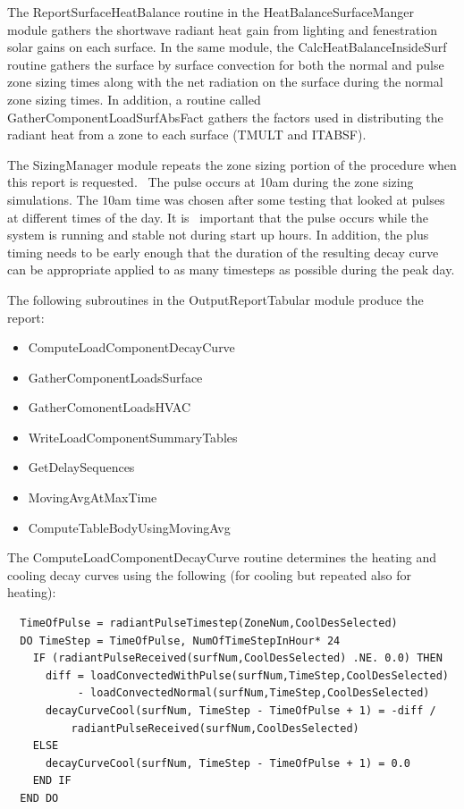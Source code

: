 The ReportSurfaceHeatBalance routine in the HeatBalanceSurfaceManger module gathers the shortwave radiant heat gain from lighting and fenestration solar gains on each surface. In the same module, the CalcHeatBalanceInsideSurf routine gathers the surface by surface convection for both the normal and pulse zone sizing times along with the net radiation on the surface during the normal zone sizing times. In addition, a routine called GatherComponentLoadSurfAbsFact gathers the factors used in distributing the radiant heat from a zone to each surface (TMULT and ITABSF).

The SizingManager module repeats the zone sizing portion of the procedure when this report is requested.~ The pulse occurs at 10am during the zone sizing simulations. The 10am time was chosen after some testing that looked at pulses at different times of the day. It is ~important that the pulse occurs while the system is running and stable not during start up hours. In addition, the plus timing needs to be early enough that the duration of the resulting decay curve can be appropriate applied to as many timesteps as possible during the peak day.

The following subroutines in the OutputReportTabular module produce the report:

\begin{itemize}
\item
  ComputeLoadComponentDecayCurve
\item
  GatherComponentLoadsSurface
\item
  GatherComonentLoadsHVAC
\item
  WriteLoadComponentSummaryTables
\item
  GetDelaySequences
\item
  MovingAvgAtMaxTime
\item
  ComputeTableBodyUsingMovingAvg
\end{itemize}

The ComputeLoadComponentDecayCurve routine determines the heating and cooling decay curves using the following (for cooling but repeated also for heating):

\begin{lstlisting}
  TimeOfPulse = radiantPulseTimestep(ZoneNum,CoolDesSelected)
  DO TimeStep = TimeOfPulse, NumOfTimeStepInHour* 24
    IF (radiantPulseReceived(surfNum,CoolDesSelected) .NE. 0.0) THEN
      diff = loadConvectedWithPulse(surfNum,TimeStep,CoolDesSelected)
           - loadConvectedNormal(surfNum,TimeStep,CoolDesSelected)
      decayCurveCool(surfNum, TimeStep - TimeOfPulse + 1) = -diff /
          radiantPulseReceived(surfNum,CoolDesSelected)
    ELSE
      decayCurveCool(surfNum, TimeStep - TimeOfPulse + 1) = 0.0
    END IF
  END DO
\end{lstlisting}

